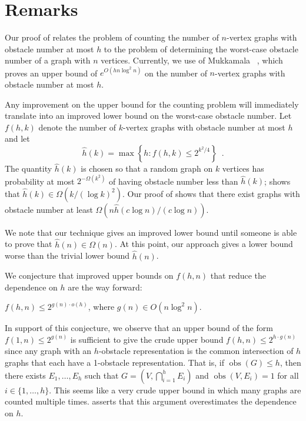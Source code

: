 \documentclass[12pt]{article}
\DeclareMathOperator{\obs}{obs}
\begin{document}
\section{Remarks}

Our proof of  relates the problem of counting the number
of $n$-vertex graphs with obstacle number at most $h$ to the problem of
determining the worst-case obstacle number of a graph with $n$ vertices.
Currently, we use  of Mukkamala \etal\ \cite{mukkamala.pach.ea:graphs},
which proves an
upper bound of $e^{O(hn\log^2 n)}$ on the number of $n$-vertex graphs
with obstacle number at most $h$.

Any improvement on the upper bound for the counting problem will
immediately translate into an improved lower bound on the worst-case
obstacle number.  Let $f(h,k)$ denote the number of $k$-vertex graphs
with obstacle number at most $h$ and let 
\[  
   \hat h(k) = \max\left\{h:f(h,k) \le 2^{k^2/4}\right\} \enspace . 
\]
The quantity $\hat h(k)$ is chosen so that a random graph on $k$
vertices has probability at most $2^{-\Omega(k^2)}$ of having
obstacle number less than $\hat h(k)$;  shows that
$\hat{h}(k)\in\Omega(k/(\log k)^2)$.  Our proof of 
shows that there exist graphs with obstacle number at least
$\Omega(n\hat{h}(c\log n)/(c\log n))$.

We note that our technique gives an improved lower bound until someone is
able to prove that $\hat h(n)\in\Omega(n)$.  At this point, our approach
gives a lower bound worse than the trivial lower bound $\hat{h}(n)$.

We conjecture that improved upper bounds on $f(h,n)$ that reduce the
dependence on $h$ are the way forward:
\begin{conj}
  $f(h,n) \le 2^{g(n)\cdot o(h)}$, where $g(n)\in O(n\log^2 n)$.
\end{conj}
In support of this conjecture, we observe that an upper bound of the
form $f(1,n)\le 2^{g(n)}$ is sufficient to give the crude upper bound
$f(h,n)\le 2^{h\cdot g(n)}$ since any graph with an $h$-obstacle
representation is the common intersection of $h$ graphs that each
have a 1-obstacle representation.  That is, if $\obs(G)\le h$, then
there exists $E_1,\ldots,E_h$ such that $G=(V,\bigcap_{i=1}^h E_i)$
and $\obs(V,E_i)=1$ for all $i\in \{1,\ldots,h\}$.  This seems like a
very crude upper bound in which many graphs are counted multiple times.
 asserts that this argument overestimates the dependence on $h$.
\end{document}
